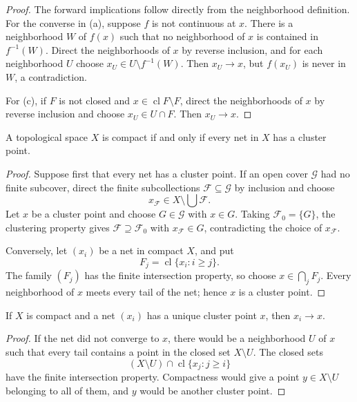 \begin{proof}
The forward implications follow directly from the neighborhood definition.
For the converse in (a), suppose $f$ is not continuous at $x$. There is a
neighborhood $W$ of $f(x)$ such that no neighborhood of $x$ is contained in
$f^{-1}(W)$. Direct the neighborhoods of $x$ by reverse inclusion, and for
each neighborhood $U$ choose
$x_U\in U\setminus f^{-1}(W)$. Then $x_U\to x$, but $f(x_U)$ is never in
$W$, a contradiction.

For (c), if $F$ is not closed and $x\in\operatorname{cl}F\setminus F$, direct
the neighborhoods of $x$ by reverse inclusion and choose $x_U\in U\cap F$.
Then $x_U\to x$.
\end{proof}

\begin{thm}
A topological space $X$ is compact if and only if every net in $X$ has a
cluster point.
\end{thm}

\begin{proof}
Suppose first that every net has a cluster point. If an open cover
$\mathcal{G}$ had no finite subcover, direct the finite subcollections
$\mathcal{F}\subseteq\mathcal{G}$ by inclusion and choose
\[
x_{\mathcal{F}}\in X\setminus\bigcup\mathcal{F}.
\]
Let $x$ be a cluster point and choose $G\in\mathcal{G}$ with $x\in G$. Taking
$\mathcal{F}_0=\{G\}$, the clustering property gives
$\mathcal{F}\supseteq\mathcal{F}_0$ with $x_{\mathcal{F}}\in G$, contradicting
the choice of $x_{\mathcal{F}}$.

Conversely, let $(x_i)$ be a net in compact $X$, and put
\[
F_j=\operatorname{cl}\{x_i:i\geq j\}.
\]
The family $(F_j)$ has the finite intersection property, so choose
$x\in\bigcap_jF_j$. Every neighborhood of $x$ meets every tail of the net;
hence $x$ is a cluster point.
\end{proof}

\begin{thm}
If $X$ is compact and a net $(x_i)$ has a unique cluster point $x$, then
$x_i\to x$.
\end{thm}

\begin{proof}
If the net did not converge to $x$, there would be a neighborhood $U$ of $x$
such that every tail contains a point in the closed set $X\setminus U$. The
closed sets
\[
(X\setminus U)\cap\operatorname{cl}\{x_j:j\geq i\}
\]
have the finite intersection property. Compactness would give a point
$y\in X\setminus U$ belonging to all of them, and $y$ would be another
cluster point.
\end{proof}

